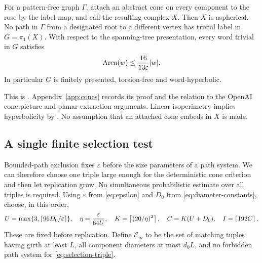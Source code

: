 \begin{theorem}\label{thm:md}
For a pattern-free graph $\Gamma$, attach an abstract cone on every component to the rose by the label map, and call the resulting complex $X$. Then $X$ is aspherical. No path in $\Gamma$ from a designated root to a different vertex has trivial label in $G=\pi_1(X)$. With respect to the spanning-tree presentation, every word trivial in $G$ satisfies
\begin{equation}\label{eq:area}
 \operatorname{Area}(w)\le\frac{16}{13\varepsilon}|w|.
\end{equation}
In particular $G$ is finitely presented, torsion-free and word-hyperbolic.
\end{theorem}
This is \cite[Definition~3.3 and Theorem~B, pp.~9--16]{MD26}. Appendix~\ref{app:cones} records its proof and the relation to the OpenAI cone-picture and planar-extraction arguments. Linear isoperimetry implies hyperbolicity by \cite[Theorem~III.H.2.9]{BH99}. No assumption that an attached cone embeds in $X$ is made.

\subsection{A single finite selection test}

Bounded-path exclusion fixes $\varepsilon$ before the size parameters of a path system. We can therefore choose one triple large enough for the deterministic cone criterion and then let replication grow. No simultaneous probabilistic estimate over all triples is required.
Using $\varepsilon$ from \eqref{eq:epsilon} and $D_0$ from \eqref{eq:diameter-constants}, choose, in this order,
\begin{equation}\label{eq:selection-triple}
 U=\max\{3,\left\lceil 96D_0/\varepsilon\right\rceil\},\quad
 \eta=\frac{\varepsilon}{64U},\quad
 K=\left\lceil (20/\eta)^2\right\rceil,\quad C=K(U+D_0),\quad I=\left\lceil 192C\right\rceil.
\end{equation}
These are fixed before replication. Define $\mathcal E_m$ to be the set of matching tuples having girth at least $L$, all component diameters at most $d_0L$, and no forbidden path system for \eqref{eq:selection-triple}.

